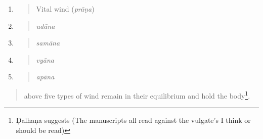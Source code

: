 \begin{translation}
                        \begin{enumerate}
                            \def\labelenumi{\arabic{enumi}.}
                            \item
                            \begin{quote}
                                Vital wind (\emph{prāṇa})
                            \end{quote}
                            \item
                            \begin{quote}
                                \emph{udāna }
                            \end{quote}
                            \item
                            \begin{quote}
                                \emph{samāna}
                            \end{quote}
                            \item
                            \begin{quote}
                                \emph{vyāna}
                            \end{quote}
                            \item
                            \begin{quote}
                                \emph{apāna}
                            \end{quote}
                        \end{enumerate}
                        
                        \begin{quote}
                            above five types of wind remain in their equilibrium and hold 
                            the
                            body\footnote{ Ḍalhaṇa suggests  (The
                                manuscripts all read                                against the
                                vulgate's  I 
                                think 
                                 or  should be read)}.
                            \end{quote}
                            

\end{translation}
